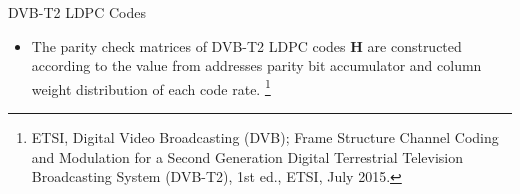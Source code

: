 \documentclass[11pt, aspectratio=169]{beamer}
\newcommand\blfootnote[1]{%
  \begingroup
  \renewcommand\thefootnote{}\footnote{#1}%
  \addtocounter{footnote}{-1}%
  \endgroup
}
\begin{document}
\begin{frame}{DVB-T2 LDPC Codes}
\begin{itemize}
\item The parity check matrices of DVB-T2 LDPC codes $\mathbf{H}$ are constructed according to the value from addresses parity bit accumulator and column weight distribution of each code rate.
\blfootnote{\tiny{ETSI, Digital Video Broadcasting (DVB); Frame Structure Channel Coding and Modulation for a Second Generation Digital Terrestrial Television Broadcasting System (DVB-T2), 1st ed., ETSI, July 2015.}}
\end{itemize}

\vspace{-20pt}








\end{frame}
\end{document}
